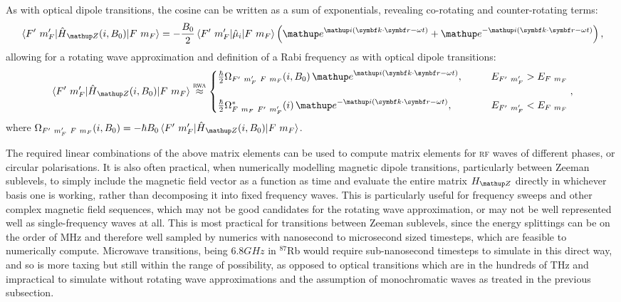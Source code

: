 As with optical dipole transitions, the cosine can be written as a sum of exponentials, revealing co-rotating and counter-rotating terms:
\begin{align}
\matrixel{F^\prime\ m_F^\prime}{\hat H_\up{Z}(i, B_0)}{F\ m_F}
=
-\frac{B_0}2\matrixel{F^\prime\ m_F^\prime}{\hat{\mu}_i}{F\ m_F}
\left(\ee^{\ii(\vec k\cdot \vec r - \omega t)}
+ \ee^{-\ii(\vec k\cdot \vec r - \omega t)}\right),
\end{align}
allowing for a rotating wave approximation and definition of a Rabi frequency as with optical dipole transitions:
\begin{align}\label{eq:magnetic_rwa_with_rabifreq}
\matrixel{F^\prime\ m_F^\prime}{\hat H_\up{Z}(i, B_0)}{F\ m_F} \overset{\textsc{rwa}}\approx
\begin{cases}
\frac\hbar2\Omega_{F^\prime\ m_F^\prime\ F\ m_F}(i, B_0)\,
\ee^{\ii(\vec k \cdot \vec r - \omega t)},\qquad
& E_{F^\prime\ m_F^\prime} > E_{F\ m_F}\\
\\
\frac\hbar2\Omega^*_{F\ m_F\ F^\prime\ m_F^\prime}(i)\,
\ee^{-\ii(\vec k \cdot \vec r - \omega t)},\qquad
& E_{F^\prime\ m_F^\prime} < E_{F\ m_F}
\end{cases},
\end{align}
where $\Omega_{F^\prime\ m_F^\prime\ F\ m_F}(i, B_0) = -\hbar B_0 \matrixel{F^\prime\ m_F^\prime}{\hat H_\up{Z}(i, B_0)}{F\ m_F}$.

The required linear combinations of the above matrix elements can be used to compute matrix elements for \textsc{rf} waves of different phases, or circular polarisations. It is also often practical, when numerically modelling magnetic dipole transitions, particularly between Zeeman sublevels, to simply include the magnetic field vector as a function as time and evaluate the entire matrix $H_\up{Z}$ directly in whichever basis one is working, rather than decomposing it into fixed frequency waves. This is particularly useful for frequency sweeps and other complex magnetic field sequences, which may not be good candidates for the rotating wave approximation, or may not be well represented well as single-frequency waves at all. This is most practical for transitions between Zeeman sublevels, since the energy splittings can be on the order of MHz and therefore well sampled by numerics with nanosecond to microsecond sized timesteps, which are feasible to numerically compute. Microwave transitions, being $6.8 \unit{GHz}$ in $^{87}$Rb would require sub-nanosecond timesteps to simulate in this direct way, and so is more taxing but still within the range of possibility, as opposed to optical transitions which are in the hundreds of THz and impractical to simulate without rotating wave approximations and the assumption of monochromatic waves as treated in the previous subsection.

